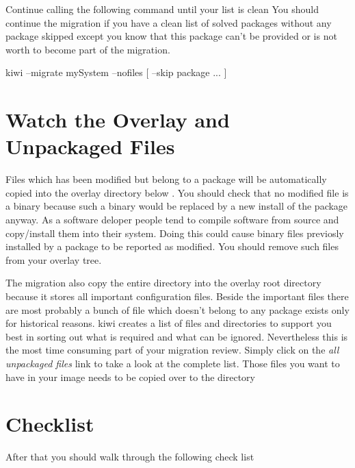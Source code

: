 Continue calling the following command until your list is clean
You should continue the migration if you have a clean list of solved
packages without any package skipped except you know that this package
can't be provided or is not worth to become part of the migration.

\begin{Command}{8cm}
kiwi --migrate mySystem --nofiles [ --skip package ... ]
\end{Command}

\section{Watch the Overlay and Unpackaged Files}
Files which has been modified but belong to a package will be
automatically copied into the overlay directory below
. You should check that no modified file
is a binary because such a binary would be replaced by a new
install of the package anyway. As a software deloper people
tend to compile software from source and copy/install them
into their system. Doing this could cause binary files previosly
installed by a package to be reported as modified. You should
remove such files from your overlay tree.

The migration also copy the entire  directory into the
overlay root directory because it stores all important configuration
files. Beside the important files there are most probably a bunch
of file which doesn't belong to any package exists only for
historical reasons. kiwi creates a list of files and
directories to support you best in sorting out what is required
and what can be ignored. Nevertheless this is the most
time consuming part of your migration review. Simply click on
the \textit{all unpackaged files} link to take a look at the
complete list. Those files you want to have in your image needs
to be copied over to the  directory

\section{Checklist}
After that you should walk through the following check list

